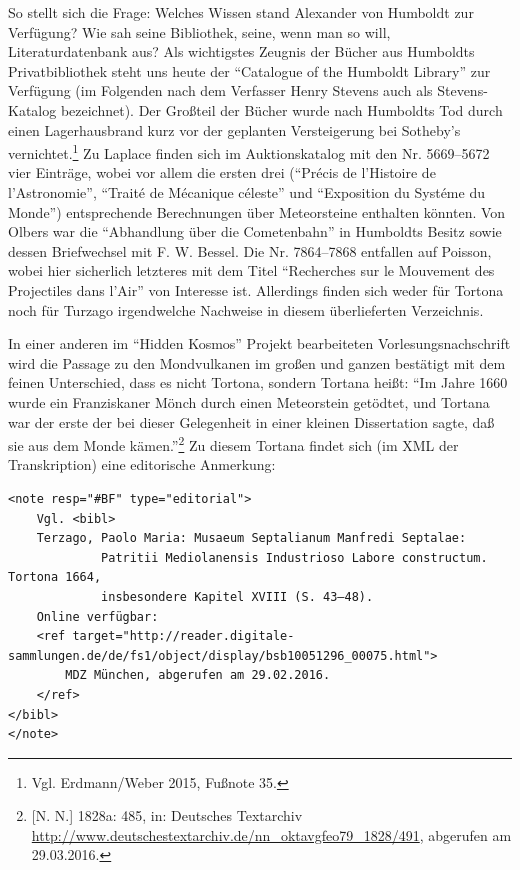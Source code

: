 So stellt sich die Frage: Welches Wissen stand Alexander von Humboldt
zur Verfügung? Wie sah seine Bibliothek, seine, wenn man so will,
Literaturdatenbank aus? Als wichtigstes Zeugnis der Bücher aus Humboldts
Privatbibliothek steht uns heute der \enquote{Catalogue of the Humboldt
Library} zur Verfügung (im Folgenden nach dem Verfasser Henry Stevens
auch als Stevens-Katalog bezeichnet). Der Großteil der Bücher wurde nach
Humboldts Tod durch einen Lagerhausbrand kurz vor der geplanten
Versteigerung bei Sotheby's vernichtet.\footnote{Vgl. Erdmann/Weber
  2015, Fußnote 35.} Zu Laplace finden sich im Auktionskatalog mit den
Nr. 5669--5672 vier Einträge, wobei vor allem die ersten drei
(\enquote{Précis de l'Histoire de l'Astronomie}, \enquote{Traité de
Mécanique céleste} und \enquote{Exposition du Systéme du Monde})
entsprechende Berechnungen über Meteorsteine enthalten könnten. Von
Olbers war die \enquote{Abhandlung über die Cometenbahn} in Humboldts
Besitz sowie dessen Briefwechsel mit F. W. Bessel. Die Nr. 7864--7868
entfallen auf Poisson, wobei hier sicherlich letzteres mit dem Titel
\enquote{Recherches sur le Mouvement des Projectiles dans l'Air} von
Interesse ist. Allerdings finden sich weder für Tortona noch für Turzago
irgendwelche Nachweise in diesem überlieferten Verzeichnis.

In einer anderen im \enquote{Hidden Kosmos} Projekt bearbeiteten
Vorlesungsnachschrift wird die Passage zu den Mondvulkanen im großen und
ganzen bestätigt mit dem feinen Unterschied, dass es nicht Tortona,
sondern Tortana heißt: \enquote{Im Jahre 1660 wurde ein Franziskaner
Mönch durch einen Meteorstein getödtet, und Tortana war der erste der
bei dieser Gelegenheit in einer kleinen Dissertation sagte, daß sie aus
dem Monde kämen.}\footnote{{[}N. N.{]} 1828a: 485, in: Deutsches
  Textarchiv
  \url{http://www.deutschestextarchiv.de/nn_oktavgfeo79_1828/491},
  abgerufen am 29.03.2016.} Zu diesem Tortana findet sich (im XML der
Transkription) eine editorische Anmerkung:


\begin{scriptsize}
\begin{verbatim}
<note resp="#BF" type="editorial">
    Vgl. <bibl>
    Terzago, Paolo Maria: Musaeum Septalianum Manfredi Septalae: 
             Patritii Mediolanensis Industrioso Labore constructum. Tortona 1664, 
             insbesondere Kapitel XVIII (S. 43–48).
    Online verfügbar: 
    <ref target="http://reader.digitale-sammlungen.de/de/fs1/object/display/bsb10051296_00075.html">
        MDZ München, abgerufen am 29.02.2016.
    </ref>
</bibl>
</note>
\end{verbatim}
\end{scriptsize}

